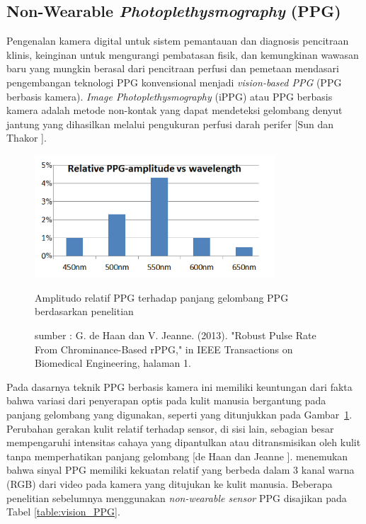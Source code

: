 \subsection{Non-Wearable \textit{Photoplethysmography} (PPG)}
Pengenalan kamera digital untuk sistem pemantauan dan diagnosis pencitraan klinis, keinginan untuk mengurangi pembatasan fisik, dan kemungkinan wawasan baru yang mungkin berasal dari pencitraan perfusi dan pemetaan mendasari pengembangan teknologi PPG konvensional menjadi \textit{vision-based PPG} (PPG berbasis kamera). \textit{Image Photoplethysmography} (iPPG) atau PPG berbasis kamera adalah metode non-kontak yang dapat mendeteksi gelombang denyut jantung yang dihasilkan melalui pengukuran perfusi darah perifer [Sun dan Thakor \citep{sun2016}]. 

\begin{figure}[ht]
\centering
 \includegraphics[width=0.8\textwidth]{wavelength}
 \caption{Amplitudo relatif PPG terhadap panjang gelombang PPG berdasarkan penelitian \citet{Crowe1992}}
  \caption*{sumber : G. de Haan dan V. Jeanne. (2013). "Robust Pulse Rate From Chrominance-Based rPPG," in IEEE Transactions on Biomedical Engineering, halaman 1.}
 \label{fig:wavelength}   
\end{figure}

Pada dasarnya teknik PPG berbasis kamera ini memiliki keuntungan dari fakta bahwa variasi dari penyerapan optis pada kulit manusia bergantung pada panjang gelombang yang digunakan, seperti yang ditunjukkan pada Gambar~\ref{fig:wavelength}. Perubahan gerakan kulit relatif terhadap sensor, di sisi lain, sebagian besar mempengaruhi intensitas cahaya yang dipantulkan atau ditransmisikan oleh kulit tanpa memperhatikan panjang gelombang [de Haan dan Jeanne \citep{deHaan2013}]. \citet{Verkruysse2008} menemukan bahwa sinyal PPG memiliki kekuatan relatif yang berbeda dalam 3 kanal warna (RGB) dari video pada kamera yang ditujukan ke kulit manusia. Beberapa penelitian sebelumnya menggunakan \textit{non-wearable sensor} PPG disajikan pada Tabel \ref{table:vision_PPG}.

